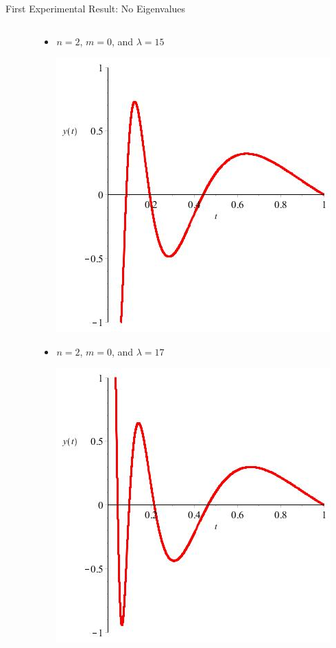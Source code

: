\documentclass{beamer}
\begin{document}
\begin{frame}{First Experimental Result: No Eigenvalues}
\begin{columns}[T]
\begin{column}{35mm}
\begin{itemize}
\end{itemize}

\end{column}

\hspace*{5mm}

\begin{column}{35mm}

\begin{itemize}

\item $n=2$, $m=0$, and $\lambda=15$

\includegraphics[scale=0.15]{NEquals2MEquals0LambdaEquals15}

\vspace{2.5mm}

\item $n=2$, $m=0$, and $\lambda=17$

\includegraphics[scale=0.15]{NEquals2MEquals0LambdaEquals17}


\end{itemize}
\end{column}
\end{columns}
\end{frame}
\end{document}
